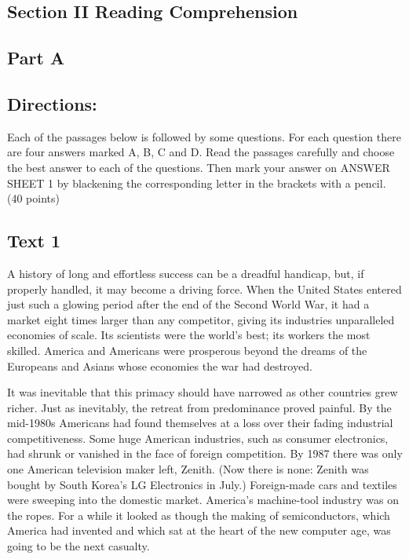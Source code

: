 \documentclass[UTF8,11pt]{ctexart}
\begin{document}
\subsection*{\textbf{Section II Reading Comprehension}}


\subsection*{\textbf{Part A}}


\subsection*{\textbf{Directions:}}


Each of the passages below is followed by some questions. For each question there are four answers marked A, B, C and D. Read the passages carefully and choose the best answer to each of the questions. Then mark your answer on ANSWER SHEET 1 by blackening the corresponding letter in the brackets with a pencil. (40 points)


\subsection*{\textbf{Text 1}}


A history of long and effortless success can be a dreadful handicap, but, if properly handled, it may become a driving force. When the United States entered just such a glowing period after the end of the Second World War, it had a market eight times larger than any competitor, giving its industries unparalleled economies of scale. Its scientists were the world’s best; its workers the most skilled. America and Americans were prosperous beyond the dreams of the Europeans and Asians whose economies the war had destroyed.


It was inevitable that this primacy should have narrowed as other countries grew richer. Just as inevitably, the retreat from predominance proved painful. By the mid-1980s Americans had found themselves at a loss over their fading industrial competitiveness. Some huge American industries, such as consumer electronics, had shrunk or vanished in the face of foreign competition. By 1987 there was only one American television maker left, Zenith. (Now there is none: Zenith was bought by South Korea’s LG Electronics in July.) Foreign-made cars and textiles were sweeping into the domestic market. America’s machine-tool industry was on the ropes. For a while it looked as though the making of semiconductors, which America had invented and which sat at the heart of the new computer age, was going to be the next casualty.
\end{document}
